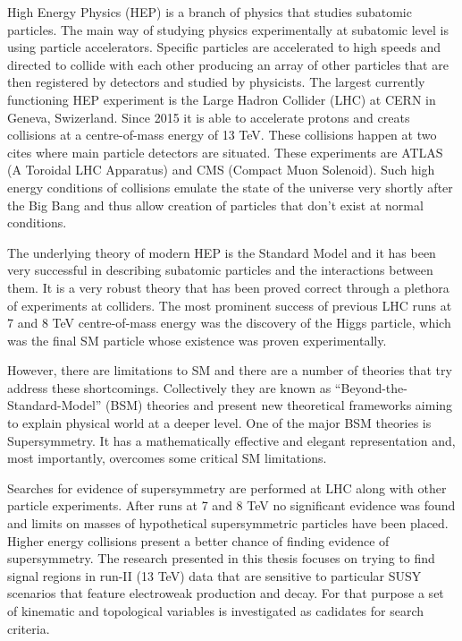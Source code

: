 High Energy Physics (HEP) is a branch of physics that studies subatomic particles. The main way of studying physics experimentally at subatomic level is using particle accelerators. Specific particles are accelerated to high speeds and directed to collide with each other producing an array of other particles that are then registered by detectors and studied by physicists. The largest currently functioning HEP experiment is the Large Hadron Collider (LHC) at CERN in Geneva, Swizerland. Since 2015 it is able to accelerate protons and creats collisions at a centre-of-mass energy of 13 TeV. These collisions happen at two cites where main particle detectors are situated. These experiments are ATLAS (A Toroidal LHC Apparatus) and CMS (Compact Muon Solenoid). Such high energy conditions of collisions emulate the state of the universe very shortly after the Big Bang and thus allow creation of particles that don't exist at normal conditions. 

The underlying theory of modern HEP is the Standard Model and it has been very successful in describing subatomic particles and the interactions between them. It is a very robust theory that has been proved correct through a plethora of experiments at colliders. The most prominent success of previous LHC runs at 7 and 8 TeV centre-of-mass energy was the discovery of the Higgs particle, which 
was the final SM particle whose existence was proven experimentally.   

However, there are limitations to SM and there are a number of theories that try address these shortcomings. Collectively they are known as “Beyond-the-Standard-Model” (BSM) theories and present new theoretical frameworks aiming to explain physical world at a deeper level. One of the major BSM theories is Supersymmetry. It has a mathematically effective and elegant representation and, most importantly, overcomes some critical SM limitations.

Searches for evidence of supersymmetry are performed at LHC along with other particle experiments. After runs at 7 and 8 TeV no significant evidence was found and limits on masses of hypothetical supersymmetric particles have been placed. Higher energy collisions present a better chance of finding  evidence of supersymmetry. The research presented in this thesis focuses on trying to find signal regions in run-II (13 TeV) data that are sensitive to particular SUSY scenarios that feature electroweak production and decay. For that purpose a set of kinematic and topological variables is investigated as cadidates for search criteria.    
